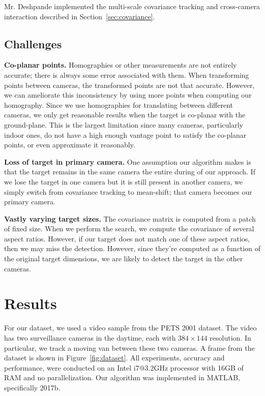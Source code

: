 \documentclass{article}
\begin{document}
Mr. Deshpande implemented the multi-scale covariance tracking and cross-camera interaction described in Section~\ref{sec:covariance}.

\subsection{Challenges}
\vspace{5pt}
\noindent\textbf{Co-planar points.} Homographies or other measurements are not entirely accurate; there is always some error associated with them. When transforming points between cameras, the transformed points are not that accurate. However, we can ameliorate this inconsistency by using more points when computing our homography. Since we use homographies for translating between different cameras, we only get reasonable results when the target is co-planar with the ground-plane. This is the largest limitation since many cameras, particularly indoor ones, do not have a high enough vantage point to satisfy the co-planar points, or even approximate it reasonably.

\vspace{5pt}
\noindent\textbf{Loss of target in primary camera.} One assumption our algorithm makes is that the target remains in the same camera the entire during of our approach. If we lose the target in one camera but it is still present in another camera, we simply switch from covariance tracking to mean-shift; that camera becomes our primary camera.

\vspace{5pt}
\noindent\textbf{Vastly varying target sizes.} The covariance matrix is computed from a patch of fixed size. When we perform the search, we compute the covariance of several aspect ratios. However, if our target does not match one of these aspect ratios, then we may miss the detection. However, since they're computed as a function of the original target dimensions, we are likely to detect the target in the other cameras.

\section{Results}
\label{sec:results}
For our dataset, we used a video sample from the PETS 2001 dataset. The video has two surveillance cameras in the daytime, each with $384\times 144$ resolution. In particular, we track a moving van between these two cameras. A frame from the dataset is shown in Figure~\ref{fig:dataset}. All experiments, accuracy and performance, were conducted on an Intel i7@3.2GHz processor with 16GB of RAM and no parallelization. Our algorithm was implemented in MATLAB, specifically 2017b.
\end{document}
